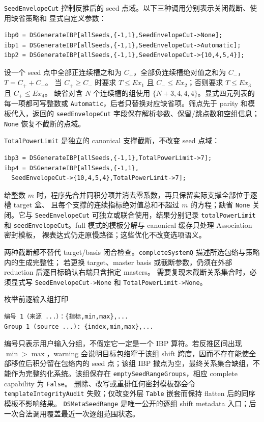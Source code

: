 ﻿\documentclass[a4paper,11pt]{article}
\begin{document}
\texttt{SeedEnvelopeCut} 控制反推后的 seed 点域。以下三种调用分别表示关闭截断、使用缺省策略和
显式自定义参数：
\begin{verbatim}
ibp0 = DSGenerateIBP[allSeeds,{-1,1},SeedEnvelopeCut->None];
ibp1 = DSGenerateIBP[allSeeds,{-1,1},SeedEnvelopeCut->Automatic];
ibp2 = DSGenerateIBP[allSeeds,{-1,1},SeedEnvelopeCut->{10,4,5,4}];
\end{verbatim}
设一个 seed 点中全部正连续槽之和为 $C_+$，全部负连续槽绝对值之和为 $C_-$，$T=C_++C_-$。
当 $C_+\geq C_-$ 时要求 $T\leq Ex_1$ 且 $C_-\leq Ex_2$；否则要求 $T\leq Ex_3$ 且 $C_+\leq Ex_4$。
缺省对含 $N$ 个连续槽的组使用 $\{N+3,4,4,4\}$。显式四元列表的每一项都可写整数或
\texttt{Automatic}，后者只替换对应缺省项。筛点先于 parity 和模板代入，返回的
\texttt{seedEnvelopeCut} 字段保存解析参数、保留/跳点数和空组信息；\texttt{None} 恢复不截断的点域。

\texttt{TotalPowerLimit} 是独立的 canonical 支撑截断，不改变 seed 点域：
\begin{verbatim}
ibp3 = DSGenerateIBP[allSeeds,{-1,1},TotalPowerLimit->7];
ibp4 = DSGenerateIBP[allSeeds,{-1,1},
  SeedEnvelopeCut->{10,4,5,4},TotalPowerLimit->7];
\end{verbatim}
给整数 $m$ 时，程序先合并同积分项并消去零系数，再只保留实际支撑全部位于逐槽 target 盒、
且每个支撑的连续指标绝对值总和不超过 $m$ 的方程；缺省 \texttt{None} 关闭。它与
\texttt{SeedEnvelopeCut} 可独立或联合使用，结果分别记录 \texttt{totalPowerLimit} 和
\texttt{seedEnvelopeCut}。full 模式的模板分解与 canonical 缓存只处理 Association 密封模板，
裸表达式仍走原慢路径；这些优化不改变选项语义。

两种截断都不替代 target/basis 闭合检查。\texttt{completeSystemQ} 描述所选包络与策略内的生成完整性；
若更换 target、master basis 或截断参数，仍须在外部 reduction 后逐目标确认右端只含指定 masters。
需要复现未截断关系集合时，必须显式写 \texttt{SeedEnvelopeCut->None} 和
\texttt{TotalPowerLimit->None}。

枚举前逐输入组打印
\begin{verbatim}
编号 1（来源 ...）：{指标,min,max},...
Group 1 (source ...): {index,min,max},...
\end{verbatim}
编号只表示用户输入分组，不假定它一定是一个 IBP 算符。若反推区间出现 $\min>\max$，warning
会说明目标包络窄于该组 shift 跨度，因而不存在能使全部移位后积分留在包络内的 seed 点；该组
IBP 撒点为空，最终关系集合缺组，不能作为完整约化系统。该组保存在
\texttt{emptySeedRangeGroups}，相应 complete capability 为 \texttt{False}。
删除、改写或重排任何密封模板都会令 \texttt{templateIntegrityAudit} 失败；仅改变外层
\texttt{Table} 嵌套而保持 flatten 后的同序模板不影响结果。
\texttt{DSMetaSeedRange} 是唯一公开的逐组 shift metadata 入口；后一次合法调用覆盖最近一次逐组范围状态。
\end{document}
